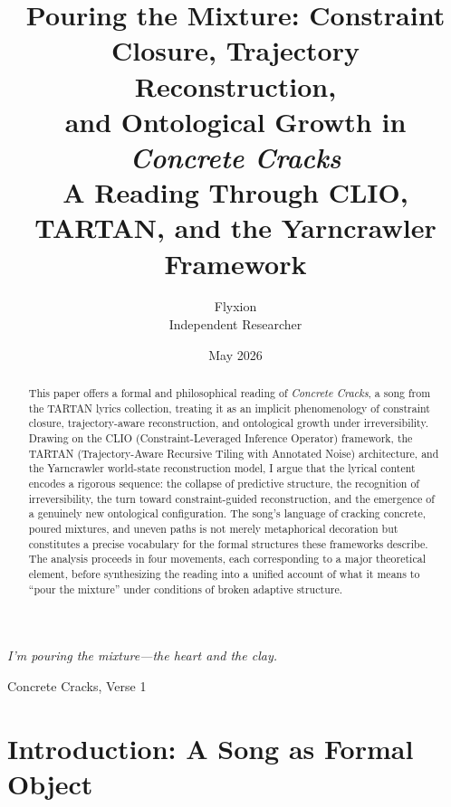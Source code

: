 \documentclass[12pt, a4paper]{article}
\title{\textbf{Pouring the Mixture: Constraint Closure, Trajectory Reconstruction,\\
and Ontological Growth in \textit{Concrete Cracks}}\vspace{0.4em}\\
{\large A Reading Through CLIO, TARTAN, and the Yarncrawler Framework}}
\author{Flyxion\\
{\small Independent Researcher}}
\date{May 2026}
\begin{document}
\maketitle

\begin{abstract}
\noindent
This paper offers a formal and philosophical reading of \textit{Concrete Cracks}, a song from the TARTAN lyrics collection, treating it as an implicit phenomenology of constraint closure, trajectory-aware reconstruction, and ontological growth under irreversibility. Drawing on the CLIO (Constraint-Leveraged Inference Operator) framework, the TARTAN (Trajectory-Aware Recursive Tiling with Annotated Noise) architecture, and the Yarncrawler world-state reconstruction model, I argue that the lyrical content encodes a rigorous sequence: the collapse of predictive structure, the recognition of irreversibility, the turn toward constraint-guided reconstruction, and the emergence of a genuinely new ontological configuration. The song's language of cracking concrete, poured mixtures, and uneven paths is not merely metaphorical decoration but constitutes a precise vocabulary for the formal structures these frameworks describe. The analysis proceeds in four movements, each corresponding to a major theoretical element, before synthesizing the reading into a unified account of what it means to ``pour the mixture'' under conditions of broken adaptive structure.
\end{abstract}

\vspace{1em}
\epigraph{\textit{I'm pouring the mixture---the heart and the clay.}}{Concrete Cracks, Verse 1}

\tableofcontents
\newpage

\section{Introduction: A Song as Formal Object}
\end{document}
